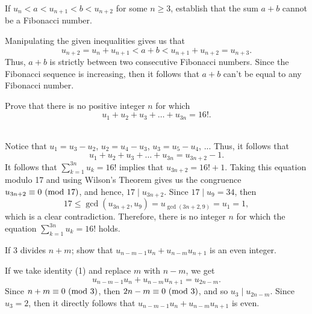 \begin{exercise}
    If $u_n < a < u_{n+1} < b < u_{n+2}$ for some $n \geq 3$, establish that the sum $a + b$ cannot be a Fibonacci number. \\
\end{exercise}

\begin{solution}
    Manipulating the given inequalities gives us that
    $$u_{n+2} = u_n + u_{n+1} < a + b < u_{n+1} + u_{n+2} = u_{n+3}.$$
    Thus, $a + b$ is strictly between two consecutive Fibonacci numbers. Since the Fibonacci sequence is increasing, then it follows that $a + b$ can't be equal to any Fibonacci number. \\
\end{solution}

\begin{exercise}
    Prove that there is no positive integer $n$ for which
    $$u_1 + u_2 + u_3 + \dots + u_{3n} = 16!.$$
     \\
\end{exercise}

\begin{solution}
    Notice that $u_1 = u_3 - u_2$, $u_2 = u_4 - u_3$, $u_3 = u_5 - u_4$, ... Thus, it follows that
    $$u_1 + u_2 + u_3 + \dots + u_{3n} = u_{3n + 2} - 1.$$
    It follows that $\sum_{k=1}^{3n}u_k = 16!$ implies that $u_{3n + 2} = 16! + 1$. Taking this equation modulo 17 and using Wilson's Theorem gives us the congruence $u_{3n + 2} \equiv 0 \ (\mathrm{mod}\ 17)$, and hence, $17 \mid u_{3n + 2}$. Since $17 \mid u_9 = 34$, then
    $$17 \leq \gcd(u_{3n + 2}, u_9) = u_{\gcd(3n + 2, 9)} = u_1 = 1,$$
    which is a clear contradiction. Therefore, there is no integer $n$ for which the equation $\sum_{k=1}^{3n}u_k = 16!$ holds. \\
\end{solution}

\begin{exercise}
    If 3 divides $n + m$; show that $u_{n-m - 1}u_n + u_{n-m}u_{n+1}$ is an even integer. \\
\end{exercise}

\begin{solution}
    If we take identity (1) and replace $m$ with $n-m$, we get
    $$u_{n-m-1}u_n + u_{n-m}u_{n+1} = u_{2n - m}.$$
    Since $n + m \equiv 0 \ (\mathrm{mod}\ 3)$, then $2n - m \equiv 0 \ (\mathrm{mod}\ 3)$, and so $u_3 \mid u_{2n - m}$. Since $u_3 = 2$, then it directly follows that $u_{n-m-1}u_n + u_{n-m}u_{n+1}$ is even. \\
\end{solution}

